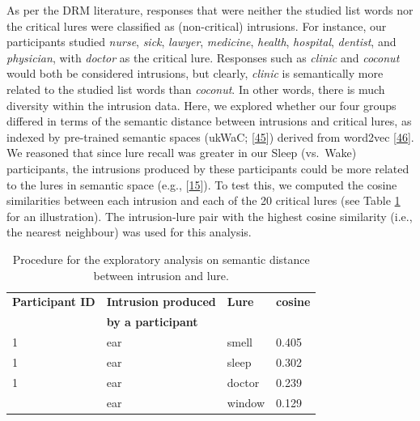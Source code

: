 \documentclass[
]{article}
\begin{document}
As per the DRM literature, responses that were neither the studied list words nor the critical lures were classified as (non-critical) intrusions. For instance, our participants studied \emph{nurse}, \emph{sick}, \emph{lawyer}, \emph{medicine}, \emph{health}, \emph{hospital}, \emph{dentist}, and \emph{physician}, with \emph{doctor} as the critical lure. Responses such as \emph{clinic} and \emph{coconut} would both be considered intrusions, but clearly, \emph{clinic} is semantically more related to the studied list words than \emph{coconut}. In other words, there is much diversity within the intrusion data. Here, we explored whether our four groups differed in terms of the semantic distance between intrusions and critical lures, as indexed by pre-trained semantic spaces (ukWaC; {[}\protect\hyperlink{ref-baroni2009a}{45}{]}) derived from word2vec {[}\protect\hyperlink{ref-guenther2015a}{46}{]}. We reasoned that since lure recall was greater in our Sleep (vs.~Wake) participants, the intrusions produced by these participants could be more related to the lures in semantic space (e.g., {[}\protect\hyperlink{ref-mak2023a}{15}{]}). To test this, we computed the cosine similarities between each intrusion and each of the 20 critical lures (see Table \ref{tab:table8} for an illustration). The intrusion-lure pair with the highest cosine similarity (i.e., the nearest neighbour) was used for this analysis.

\begin{table}[H]

\caption{\label{tab:table8}Procedure for the exploratory analysis on semantic distance between intrusion and lure.}
\centering
\begin{tabular}[t]{llll}
\toprule
\textbf{Participant ID} & \textbf{Intrusion produced} & \textbf{Lure} & \textbf{cosine}\\
\textbf{} & \textbf{by a participant} & \textbf{} & \textbf{}\\
\midrule
1 & ear & smell & 0.405\\
1 & ear & sleep & 0.302\\
1 & ear & doctor & 0.239\\
\addlinespace
1 & ear & window & 0.129\\
\bottomrule
\end{tabular}
\end{table}
\end{document}
